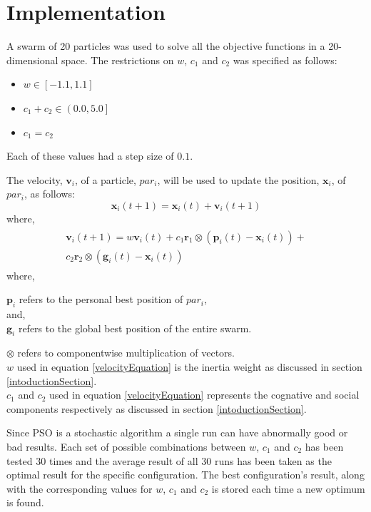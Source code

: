 \documentclass[hidelinks,english,conference]{IEEEtran}
\begin{document}
\section{Implementation}
A swarm of 20 particles was used to solve all the objective functions in a 20-dimensional space. The restrictions on $w$, $c_1$ and $c_2$ was specified as follows:
\begin{itemize}
	\item $w \in \left[-1.1, 1.1\right]$
	\item $c_1 + c_2 \in \left(0.0, 5.0\right]$
	\item $c_1 = c_2$
\end{itemize}

Each of these values had a step size of $0.1$.

The velocity, $\textbf{v}_i$, of a particle, $par_i$, will be used to update the position, $\textbf{x}_i$, of $par_i$, as follows:\\
\begin{equation}
	\textbf{x}_i(t+1)=\textbf{x}_i(t) + \textbf{v}_i(t+1)
\end{equation}
where,
\begin{align}\label{velocityEquation}
\begin{split}
	\textbf{v}_i(t+1)=w\textbf{v}_i(t) + c_1\textbf{r}_1 \otimes (\textbf{p}_i(t) - \textbf{x}_i(t)) +\\c_2\textbf{r}_2 \otimes (\textbf{g}_i(t) - \textbf{x}_i(t))
\end{split}
\end{align}
where,\\
\begin{center}
	$\textbf{p}_i$ refers to the personal best position of $par_i$,\\
	and,\\
	$\textbf{g}_i$ refers to the global best position of the entire swarm.
\end{center}

$\otimes$ refers to componentwise multiplication of vectors.\\
$w$ used in equation \ref{velocityEquation} is the inertia weight as discussed in section \ref{intoductionSection}.\\
$c_{1}$ and $c_{2}$  used in equation \ref{velocityEquation} represents the cognative and social components respectively as discussed in section \ref{intoductionSection}.

Since PSO is a stochastic algorithm a single run can have abnormally good or bad results. Each set of possible combinations between $w$, $c_{1}$ and $c_{2}$ has been tested 30 times and the average result of all 30 runs has been taken as the optimal result for the specific configuration. The best configuration's result, along with the corresponding values for $w$, $c_{1}$ and $c_{2}$ is stored each time a new optimum is found.
\end{document}

